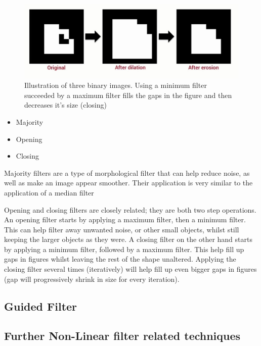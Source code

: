 \documentclass[twoside,a4paper,article]{combine}
\begin{document}
\begin{figure}[H]
    \centering
    \includegraphics[width=1\linewidth]{minmax2.PNG}
    \caption{Illustration of three binary images. Using a minimum filter succeeded by a maximum filter fills the gaps in the figure and then decreases it's size (closing)}
    \label{fig:enter-label}
\end{figure}

\begin{itemize}
    \item Majority
    \item Opening
    \item Closing
\end{itemize}
Majority filters are a type of morphological filter that can help reduce noise, as well as make an image appear smoother. Their application is very similar to the application of a median filter

Opening and closing filters are closely related; they are both two step operations.
An opening filter starts by applying a maximum filter, then a minimum filter. This can help filter away unwanted noise, or other small objects, whilst still keeping the larger objects as they were. A closing filter on the other hand starts by applying a minimum filter, followed by a maximum filter. This help fill up gaps in figures whilst leaving the rest of the shape unaltered. Applying the closing filter several times (iteratively) will help fill up even bigger gaps in figures (gap will progressively shrink in size for every iteration).

\subsection{Guided Filter}


\subsection{Further Non-Linear filter related techniques}
\end{document}
